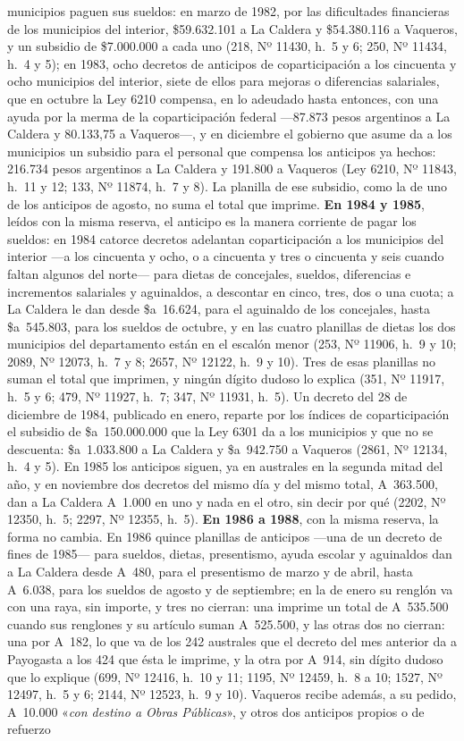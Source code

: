 municipios paguen sus sueldos: en marzo de 1982, por las dificultades financieras de los municipios del interior, \$59.632.101 a La Caldera y \$54.380.116 a Vaqueros, y un subsidio de \$7.000.000 a cada uno (218, Nº 11430, h.\ 5 y 6; 250, Nº 11434, h.\ 4 y 5); en 1983, ocho decretos de anticipos de coparticipación a los cincuenta y ocho municipios del interior, siete de ellos para mejoras o diferencias salariales, que en octubre la Ley 6210 compensa, en lo adeudado hasta entonces, con una ayuda por la merma de la coparticipación federal ---87.873 pesos argentinos a La Caldera y 80.133,75 a Vaqueros---, y en diciembre el gobierno que asume da a los municipios un subsidio para el personal que compensa los anticipos ya hechos: 216.734 pesos argentinos a La Caldera y 191.800 a Vaqueros (Ley 6210, Nº 11843, h.\ 11 y 12; 133, Nº 11874, h.\ 7 y 8). La planilla de ese subsidio, como la de uno de los anticipos de agosto, no suma el total que imprime. \textbf{En 1984 y 1985}, leídos con la misma reserva, el anticipo es la manera corriente de pagar los sueldos: en 1984 catorce decretos adelantan coparticipación a los municipios del interior ---a los cincuenta y ocho, o a cincuenta y tres o cincuenta y seis cuando faltan algunos del norte--- para dietas de concejales, sueldos, diferencias e incrementos salariales y aguinaldos, a descontar en cinco, tres, dos o una cuota; a La Caldera le dan desde \$a~16.624, para el aguinaldo de los concejales, hasta \$a~545.803, para los sueldos de octubre, y en las cuatro planillas de dietas los dos municipios del departamento están en el escalón menor (253, Nº 11906, h.\ 9 y 10; 2089, Nº 12073, h.\ 7 y 8; 2657, Nº 12122, h.\ 9 y 10). Tres de esas planillas no suman el total que imprimen, y ningún dígito dudoso lo explica (351, Nº 11917, h.\ 5 y 6; 479, Nº 11927, h.\ 7; 347, Nº 11931, h.\ 5). Un decreto del 28 de diciembre de 1984, publicado en enero, reparte por los índices de coparticipación el subsidio de \$a~150.000.000 que la Ley 6301 da a los municipios y que no se descuenta: \$a~1.033.800 a La Caldera y \$a~942.750 a Vaqueros (2861, Nº 12134, h.\ 4 y 5). En 1985 los anticipos siguen, ya en australes en la segunda mitad del año, y en noviembre dos decretos del mismo día y del mismo total, A~363.500, dan a La Caldera A~1.000 en uno y nada en el otro, sin decir por qué (2202, Nº 12350, h.\ 5; 2297, Nº 12355, h.\ 5). \textbf{En 1986 a 1988}, con la misma reserva, la forma no cambia. En 1986 quince planillas de anticipos ---una de un decreto de fines de 1985--- para sueldos, dietas, presentismo, ayuda escolar y aguinaldos dan a La Caldera desde A~480, para el presentismo de marzo y de abril, hasta A~6.038, para los sueldos de agosto y de septiembre; en la de enero su renglón va con una raya, sin importe, y tres no cierran: una imprime un total de A~535.500 cuando sus renglones y su artículo suman A~525.500, y las otras dos no cierran: una por A~182, lo que va de los 242 australes que el decreto del mes anterior da a Payogasta a los 424 que ésta le imprime, y la otra por A~914, sin dígito dudoso que lo explique (699, Nº 12416, h.\ 10 y 11; 1195, Nº 12459, h.\ 8 a 10; 1527, Nº 12497, h.\ 5 y 6; 2144, Nº 12523, h.\ 9 y 10). Vaqueros recibe además, a su pedido, A~10.000 «\textit{con destino a Obras Públicas}», y otros dos anticipos propios o de refuerzo 